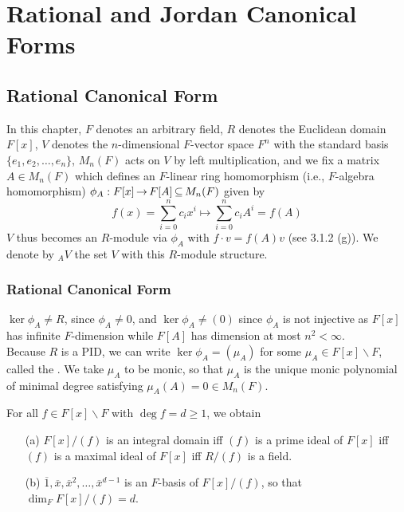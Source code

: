 \documentclass[11pt]{book}
\theoremstyle{definition}   \newtheorem{defn}[counter]{Definition} %
\newcommand{\ov}{\overline}   \newcommand{\wt}{\widetilde}
\newcommand{\bs}{\backslash}   \newcommand{\A}{\mathcal{A}}   \newcommand{\sy}{\textnormal{Syl}}   \newcommand{\size}[1]{\left| #1 \right|}
\DeclareMathOperator{\ra}{\rightarrow}   \DeclareMathOperator{\Poly}{\mathbf{P}}   \DeclareMathOperator{\spn}{\textnormal{span}}   \DeclareMathOperator{\aut}{\textnormal{Aut}}
\newcommand{\vs}{\vspace{8pt}}
\numberwithin{counter}{chapter}
\begin{document}
\part{Rational and Jordan Canonical Forms}





\chapter{Rational Canonical Form}

In this chapter, $F$ denotes an arbitrary field, $R$ denotes the Euclidean domain $F[x]$, $V$ denotes the $n$-dimensional $F$-vector space $F^n$ with the standard basis $\{e_1,e_2,\dots,e_n\}$, $M_n(F)$ acts on $V$ by left multiplication, and we fix a matrix $A \in M_n(F)$ which defines an $F$-linear ring homomorphism (i.e., $F$-algebra homomorphism) $\phi_A : F[x] \ra F[A] \sub M_n(F)$ given by
	\[f(x) = \sum_{i=0}^n c_i x^i \mapsto \sum_{i=0}^n c_i A^i = f(A) \]
$V$ thus becomes an $R$-module via $\phi_A$ with $f \cdot v = f(A) v$ (see 3.1.2 (g)). We denote by $_AV$ the set $V$ with this $R$-module structure.

\section{Rational Canonical Form}

\begin{remark}[+ Definition]
$\ker \phi_A \ne R$, since $\phi_A \ne 0$, and $\ker \phi_A \ne (0)$ since $\phi_A$ is not injective as $F[x]$ has infinite $F$-dimension while $F[A]$ has dimension at most $n^2 < \infty$. \\

Because $R$ is a PID, we can write $\ker \phi_A = (\mu_A)$ for some $\mu_A \in F[x]\bs F$, called the . We take $\mu_A$ to be monic, so that $\mu_A$ is the unique monic polynomial of minimal degree satisfying $\mu_A(A) = 0 \in M_n(F)$.
\end{remark}

\vs

\begin{lemma}
For all $f \in F[x]\bs F$ with $\deg f = d \geq 1$, we obtain
\begin{enumerate}
\item[(a)] $F[x]/(f)$ is an integral domain iff $(f)$ is a prime ideal of $F[x]$ iff $(f)$ is a maximal ideal of $F[x]$ iff $R/(f)$ is a field.
\item[(b)] $\ov{1}, \ov{x}, \ov{x}^2,\dots,\ov{x}^{d-1}$ is an $F$-basis of $F[x]/(f)$, so that $\dim_F F[x]/(f) = d$.
\end{enumerate}
\end{lemma}
\end{document}
